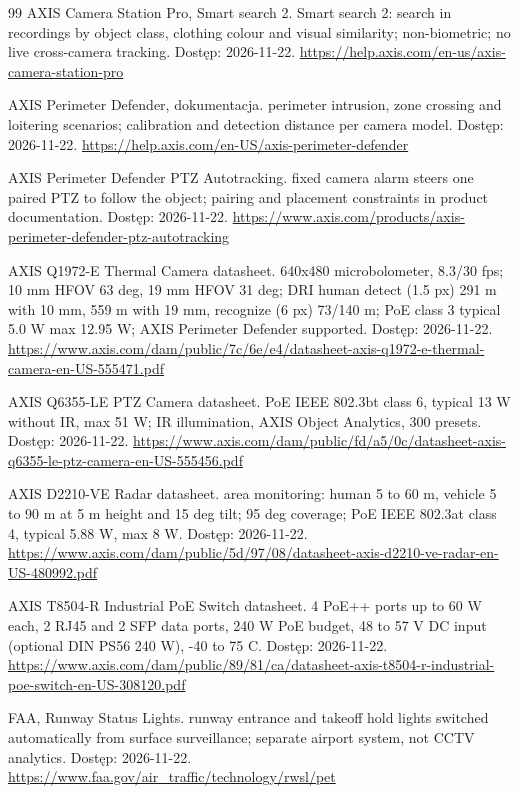 \begin{thebibliography}{99}
 AXIS Camera Station Pro, Smart search 2. Smart search 2: search in recordings by object class, clothing colour and visual similarity; non-biometric; no live cross-camera tracking. Dostęp: 2026-11-22.
\url{https://help.axis.com/en-us/axis-camera-station-pro}

 AXIS Perimeter Defender, dokumentacja. perimeter intrusion, zone crossing and loitering scenarios; calibration and detection distance per camera model. Dostęp: 2026-11-22.
\url{https://help.axis.com/en-US/axis-perimeter-defender}

 AXIS Perimeter Defender PTZ Autotracking. fixed camera alarm steers one paired PTZ to follow the object; pairing and placement constraints in product documentation. Dostęp: 2026-11-22.
\url{https://www.axis.com/products/axis-perimeter-defender-ptz-autotracking}

 AXIS Q1972-E Thermal Camera datasheet. 640x480 microbolometer, 8.3/30 fps; 10 mm HFOV 63 deg, 19 mm HFOV 31 deg; DRI human detect (1.5 px) 291 m with 10 mm, 559 m with 19 mm, recognize (6 px) 73/140 m; PoE class 3 typical 5.0 W max 12.95 W; AXIS Perimeter Defender supported. Dostęp: 2026-11-22.
\url{https://www.axis.com/dam/public/7c/6e/e4/datasheet-axis-q1972-e-thermal-camera-en-US-555471.pdf}

 AXIS Q6355-LE PTZ Camera datasheet. PoE IEEE 802.3bt class 6, typical 13 W without IR, max 51 W; IR illumination, AXIS Object Analytics, 300 presets. Dostęp: 2026-11-22.
\url{https://www.axis.com/dam/public/fd/a5/0c/datasheet-axis-q6355-le-ptz-camera-en-US-555456.pdf}

 AXIS D2210-VE Radar datasheet. area monitoring: human 5 to 60 m, vehicle 5 to 90 m at 5 m height and 15 deg tilt; 95 deg coverage; PoE IEEE 802.3at class 4, typical 5.88 W, max 8 W. Dostęp: 2026-11-22.
\url{https://www.axis.com/dam/public/5d/97/08/datasheet-axis-d2210-ve-radar-en-US-480992.pdf}

 AXIS T8504-R Industrial PoE Switch datasheet. 4 PoE++ ports up to 60 W each, 2 RJ45 and 2 SFP data ports, 240 W PoE budget, 48 to 57 V DC input (optional DIN PS56 240 W), -40 to 75 C. Dostęp: 2026-11-22.
\url{https://www.axis.com/dam/public/89/81/ca/datasheet-axis-t8504-r-industrial-poe-switch-en-US-308120.pdf}

 FAA, Runway Status Lights. runway entrance and takeoff hold lights switched automatically from surface surveillance; separate airport system, not CCTV analytics. Dostęp: 2026-11-22.
\url{https://www.faa.gov/air_traffic/technology/rwsl/pet}


\end{thebibliography}
